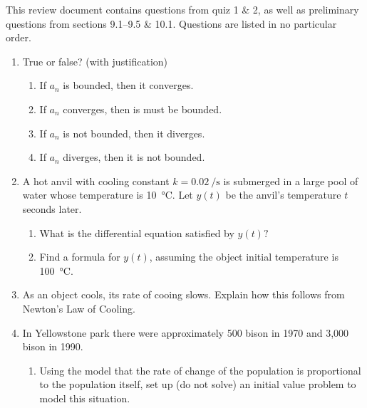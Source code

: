 \documentclass{nosvagor-notes}
\begin{document}
This review document contains questions from quiz 1 \& 2, as well as
preliminary questions from sections 9.1--9.5 \& 10.1. Questions are listed in
no particular order.

\begin{enumerate}
  \item True or false? (with justification)
  \begin{enumerate}
    \item If \({a_n}\) is bounded, then it converges.
      \vspace{140pt}
    \item If \({a_n}\) converges, then is must be bounded.
      \vspace{140pt}
    \item If \({a_n}\) is not bounded, then it diverges.
      \vspace{140pt}
    \item If \({a_n}\) diverges, then it is not bounded.
      \vspace{140pt}
  \end{enumerate}

  \newpage

 \item A hot anvil with cooling constant \(k = \SI{0.02}{\per\second}\) is
   submerged in a large pool of water whose temperature is \SI{10}{\celsius}.
   Let \(y(t)\) be the anvil’s temperature \(t\) seconds later.
   \begin{enumerate}
     \item What is the differential equation satisfied by \(y(t)?\)
       \vspace{140pt}

     \item Find a formula for \(y(t)\), assuming the object initial temperature
       is \SI{100}{\celsius}.
       \vspace{180pt}
   \end{enumerate}

  \item As an object cools, its rate of cooing slows. Explain how this follows
    from Newton's Law of Cooling.

    \newpage

  \item In Yellowstone park there were approximately 500 bison in 1970 and
    3,000 bison in 1990.
    \begin{enumerate}
      \item Using the model that the rate of change of the population is
        proportional to the population itself, set up (do not solve) an initial
        value problem to model this situation.
        \vspace{140pt}


\end{enumerate}
\end{enumerate}
\end{document}
